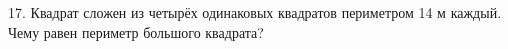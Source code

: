 17. Квадрат сложен из четырёх одинаковых квадратов периметром 14 м каждый. Чему равен периметр большого квадрата?\\
